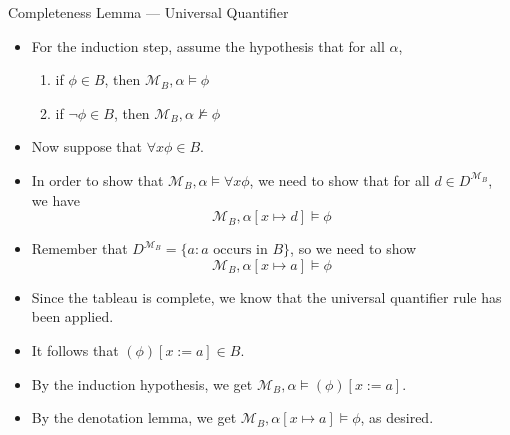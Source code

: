 \begin{frame}{Completeness Lemma --- Universal Quantifier}

  \begin{itemize}
  \item For the induction step, assume the hypothesis that for all
    $\alpha$,
     \begin{enumerate}[1.]

                      \item if $\phi\in B$, then
                        $\mathcal{M}_B,\alpha\vDash\phi$

                        \item if $\neg\phi\in B$, then
                          $\mathcal{M}_B,\alpha\nvDash\phi$ 
                      
                        \end{enumerate}

                      \item Now suppose that $\forall x\phi\in B$.

                        \item In order to show that
                          $\mathcal{M}_{B},\alpha\vDash\forall x\phi$, we
                          need to show that for all $d\in
                          D^{\mathcal{M}_B}$, we
                          have \[\mathcal{M}_B,\alpha[x\mapsto
                            d]\vDash \phi\]
                          \item Remember that $D^{\mathcal{M}_B}=\{a:
                            a\text{ occurs in }
                            B\}$, so we need to show \[\mathcal{M}_B,\alpha[x\mapsto
                            a]\vDash \phi\]

                              \item Since the tableau is complete, we
                                know that the universal quantifier
                                rule has been applied.

                                \item It follows that $(\phi)[x:=a]\in
                                  B$.

                                  \item By the induction hypothesis,
                                    we get $\mathcal{M}_{B},\alpha\vDash
                                    (\phi)[x:=a]$.

                                    \item By the denotation lemma, we
                                      get $\mathcal{M}_B,\alpha[x\mapsto
                            a]\vDash \phi$, as desired.
                        
  \end{itemize}
  
\end{frame}

